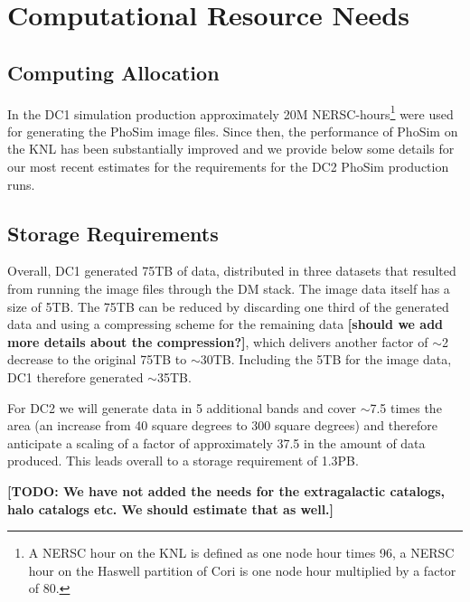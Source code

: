 \documentclass[preprint,times]{aastex61}
\newcommand*{\note}[1]{\textbf{[#1]}}
\newcommand*{\todo}[1]{\note{TODO: #1}}
\begin{document}


\section{Computational Resource Needs}

\subsection{Computing Allocation}
\label{compute}

In the DC1 simulation production approximately 20M NERSC-hours\footnote{A NERSC hour on the KNL is defined as one node hour times 96, a NERSC hour on the Haswell partition of Cori is one node hour multiplied by a factor of 80.} were used for generating
the PhoSim image files. Since then, the performance of PhoSim on the KNL has been substantially improved and
we provide below some details for our most recent estimates for the requirements for the DC2 PhoSim production runs.

\subsection{Storage Requirements}

Overall, DC1 generated 75TB of data, distributed in three datasets that resulted from running the image files through the DM stack. The image data itself has a size of 5TB. The 75TB can be reduced by discarding one third of the generated data and using a compressing scheme for the remaining data \note{should we add more details about the compression?}, which delivers another factor of $\sim$2 decrease to the original 75TB to $\sim 30$TB. Including the 5TB for the image data, DC1 therefore generated $\sim$35TB.

For DC2 we will generate data in 5 additional bands and cover $\sim$7.5 times the area (an increase from 40 square degrees to 300 square degrees) and therefore anticipate a scaling of a factor of approximately 37.5 in the amount of data produced. This leads overall to a storage requirement of 1.3PB.

\todo{We have not added the needs for the extragalactic catalogs, halo catalogs etc. We should estimate that as well.}
\end{document}
